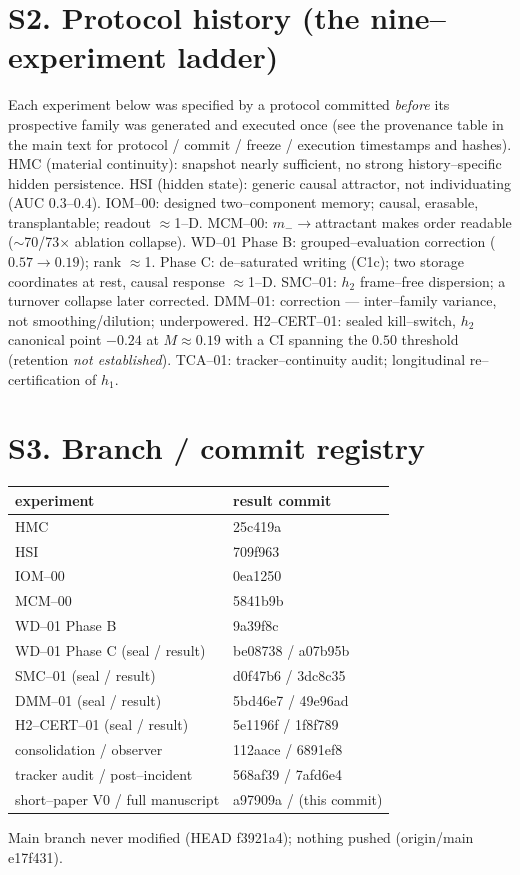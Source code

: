 \documentclass[11pt]{article}
\begin{document}
\section{S2. Protocol history (the nine--experiment ladder)}
Each experiment below was specified by a protocol committed \emph{before} its prospective family was
generated and executed once (see the provenance table in the main text for protocol / commit / freeze /
execution timestamps and hashes). HMC (material continuity): snapshot nearly sufficient, no strong
history--specific hidden persistence. HSI (hidden state): generic causal attractor, not individuating
(AUC $0.3$--$0.4$). IOM--00: designed two--component memory; causal, erasable, transplantable; readout
$\approx$1--D. MCM--00: $m_-\!\to$attractant makes order readable ($\sim$70/73$\times$ ablation collapse).
WD--01 Phase B: grouped--evaluation correction ($0.57\to0.19$); rank $\approx$1. Phase C: de--saturated
writing (C1c); two storage coordinates at rest, causal response $\approx$1--D. SMC--01: $h_2$ frame--free
dispersion; a turnover collapse later corrected. DMM--01: correction --- inter--family variance, not
smoothing/dilution; underpowered. H2--CERT--01: sealed kill--switch, $h_2$ canonical point $-0.24$ at $M\approx0.19$
with a CI spanning the $0.50$ threshold (retention \emph{not established}). TCA--01: tracker--continuity
audit; longitudinal re--certification of $h_1$.

\section{S3. Branch / commit registry}
\begin{longtable}{@{}ll@{}}\toprule experiment & result commit\\\midrule
HMC & 25c419a\\ HSI & 709f963\\ IOM--00 & 0ea1250\\ MCM--00 & 5841b9b\\ WD--01 Phase B & 9a39f8c\\
WD--01 Phase C (seal / result) & be08738 / a07b95b\\ SMC--01 (seal / result) & d0f47b6 / 3dc8c35\\
DMM--01 (seal / result) & 5bd46e7 / 49e96ad\\ H2--CERT--01 (seal / result) & 5e1196f / 1f8f789\\
consolidation / observer & 112aace / 6891ef8\\ tracker audit / post--incident & 568af39 / 7afd6e4\\
short--paper V0 / full manuscript & a97909a / (this commit)\\\bottomrule\end{longtable}
Main branch never modified (HEAD f3921a4); nothing pushed (origin/main e17f431).
\end{document}
